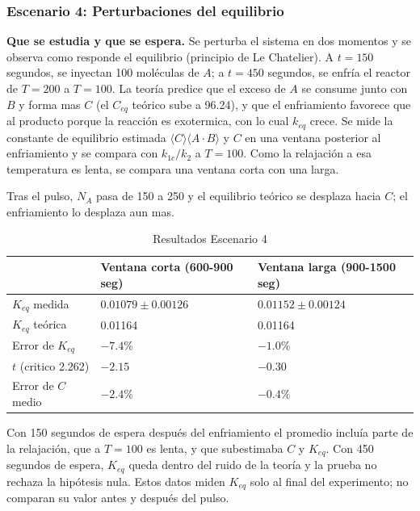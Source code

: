 \documentclass{article}
\begin{document}
\subsubsection{Escenario 4: Perturbaciones del equilibrio}
\textbf{Que se estudia y que se espera.} Se perturba el sistema en dos momentos y se observa como responde el equilibrio (principio de Le Chatelier). A $t=150$ segundos, se inyectan 100 moléculas de $A$; a $t=450$ segundos, se enfría el reactor de $T=200$ a $T=100$. La teoría predice que el exceso de $A$ se consume junto con $B$ y forma mas $C$ (el $C_{eq}$ teórico sube a 96.24), y que el enfriamiento favorece que al producto porque la reacción es exotermica, con lo cual $k_{eq}$ crece. Se mide la constante de equilibrio estimada $\langle C \rangle \langle A\cdot B\rangle $ y $C$ en una ventana posterior al enfriamiento y se compara con $k_{1c}/k_2$ a $T=100$. Como la relajación a esa temperatura es lenta, se compara una ventana corta con una larga.

Tras el pulso, $N_A$ pasa de 150 a 250 y el equilibrio teórico se desplaza hacia $C$; el enfriamiento lo desplaza aun mas.

\begin{table}[H]
\centering
\renewcommand{\arraystretch}{1.3} 
\caption{Resultados Escenario 4}
\begin{tabularx}{\textwidth}{ | Y | Y | Y |}
    \hline
    & \textbf{Ventana corta (600-900 seg)} & \textbf{Ventana larga (900-1500 seg)} \\
    \hline
    $K_{eq}$ medida & $0.01079 \pm 0.00126$ & $0.01152 \pm 0.00124$ \\
    \hline
    $K_{eq}$ teórica & 0.01164 & 0.01164 \\
    \hline
    Error de $K_{eq}$ & $-7.4$\% & $-1.0$\% \\
    \hline
    $t$ (critico 2.262) & $-2.15$ & $-0.30$ \\
    \hline
    Error de $C$ medio & $-2.4$\% & $-0.4$\% \\
    \hline
\end{tabularx}
\end{table}

Con 150 segundos de espera después del enfriamiento el promedio incluía parte de la relajación, que a $T=100$ es lenta, y que subestimaba $C$ y $K_{eq}$. Con 450 segundos de espera, $K_{eq}$ queda dentro del ruido de la teoría y la prueba no rechaza la hipótesis nula. Estos datos miden $K_{eq}$ solo al final del experimento; no comparan su valor antes y después del pulso.
\end{document}
